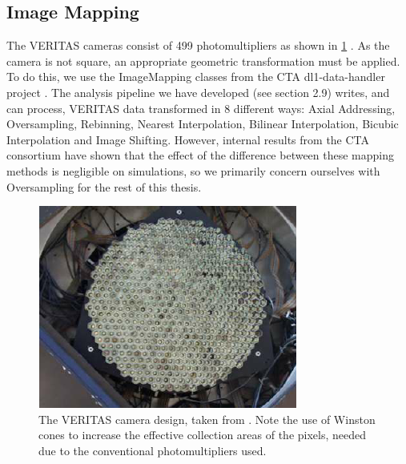 \subsection{Image Mapping}
The VERITAS cameras consist of 499 photomultipliers as shown in \ref{fig:verc} \cite{vercam}.
As the camera is not square, an appropriate geometric transformation must be applied. To do this, we use the ImageMapping classes from the CTA dl1-data-handler project \cite{dl1dh}. The analysis pipeline we have developed (see section 2.9) writes, and can process, VERITAS data transformed in 8 different ways: Axial Addressing, Oversampling, Rebinning, Nearest Interpolation, Bilinear Interpolation, Bicubic Interpolation and Image Shifting. However, internal results from the CTA consortium have shown that the effect of the difference between these mapping methods is negligible on simulations, so we primarily concern ourselves with Oversampling for the rest of this thesis.
\begin{figure}[h]
        \begin{center}
        \includegraphics[width=0.6\columnwidth]{figures/verc.png}

        \caption{
                \label{fig:verc} 
                The VERITAS camera design, taken from \cite{vercam}. Note the use of Winston cones to increase the effective collection areas of the pixels, needed due to the conventional photomultipliers used.
        }
        \end{center}
\end{figure}


